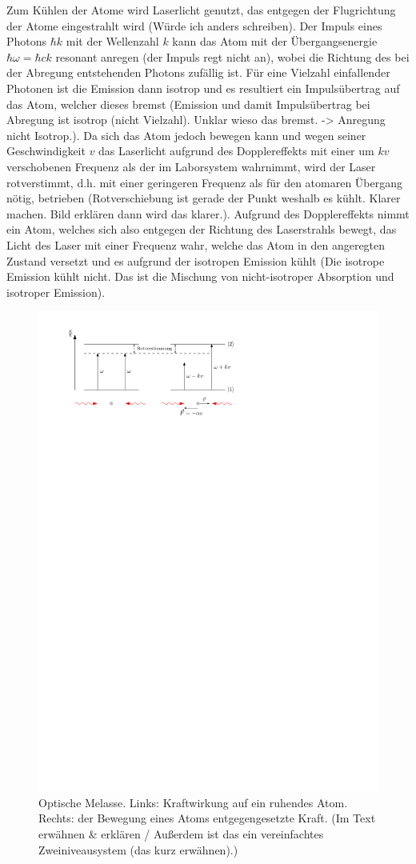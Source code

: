 \documentclass[11pt, a4paper]{article}
\numberwithin{equation}{section}
\newcommand{\korr}[1]{{\color{red}(#1)}}
\begin{document}
Zum Kühlen der Atome wird Laserlicht genutzt, das entgegen der Flugrichtung der Atome eingestrahlt wird \korr{Würde ich anders schreiben}.
Der Impuls eines Photons $\hbar k$ mit der Wellenzahl $k$ kann das Atom mit der Übergangsenergie $\hbar\omega = \hbar c k$ resonant anregen \korr{der Impuls regt nicht an}, wobei die Richtung des bei der Abregung entstehenden Photons zufällig ist.
Für eine Vielzahl einfallender Photonen ist die Emission dann isotrop und es resultiert ein Impulsübertrag auf das Atom, welcher dieses bremst \korr{Emission und damit Impulsübertrag bei Abregung ist isotrop (nicht Vielzahl). Unklar wieso das bremst. -> Anregung nicht Isotrop.}.
Da sich das Atom jedoch bewegen kann und wegen seiner Geschwindigkeit $v$ das Laserlicht aufgrund des Dopplereffekts mit einer um $kv$ verschobenen Frequenz als der im Laborsystem wahrnimmt, wird der Laser rotverstimmt, d.h. mit einer geringeren Frequenz als für den atomaren Übergang nötig, betrieben \korr{Rotverschiebung ist gerade der Punkt weshalb es kühlt. Klarer machen. Bild erklären dann wird das klarer.}.
Aufgrund des Dopplereffekts nimmt ein Atom, welches sich also entgegen der Richtung des Laserstrahls bewegt, das Licht des Laser mit einer Frequenz wahr, welche das Atom in den angeregten Zustand versetzt und es aufgrund der isotropen Emission kühlt \korr{Die isotrope Emission kühlt nicht. Das ist die Mischung von nicht-isotroper Absorption und isotroper Emission}.
\begin{figure}[h]
	\centering
	\includegraphics[width=.8\textwidth]{./figures/theory/melasse}
	\caption{Optische Melasse. Links: Kraftwirkung auf ein ruhendes Atom. Rechts: der Bewegung eines Atoms entgegengesetzte Kraft. \korr{Im Text erwähnen \& erklären / Außerdem ist das ein vereinfachtes Zweiniveausystem (das kurz erwähnen).}}
\end{figure}
\end{document}

